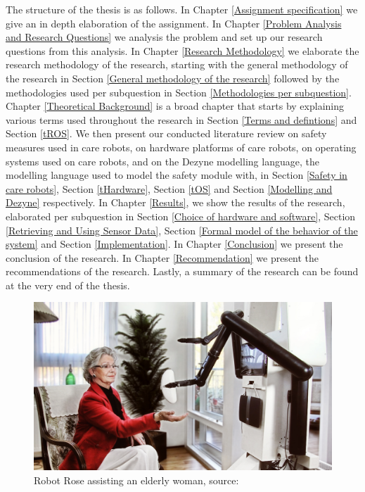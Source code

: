 \documentclass[12pt]{scrreprt}
\begin{document}
The structure of the thesis is as follows. In Chapter \ref{Assignment specification} we give an in depth elaboration of the assignment. In Chapter \ref{Problem Analysis and Research Questions} we analysis the problem and set up our research questions from this analysis. In Chapter \ref{Research Methodology} we elaborate the research methodology of the research, starting with the general methodology of the research in Section \ref{General methodology of the research} followed by the methodologies used per subquestion in Section \ref{Methodologies per subquestion}. Chapter \ref{Theoretical Background} is a broad chapter that starts by explaining various terms used throughout the research in Section \ref{Terms and defintions} and Section \ref{tROS}. We then present our conducted literature review on safety measures used in care robots, on hardware platforms of care robots, on operating systems used on care robots, and on the Dezyne modelling language, the modelling language used to model the safety module with, in Section \ref{Safety in care robots}, Section \ref{tHardware}, Section \ref{tOS} and Section \ref{Modelling and Dezyne} respectively. In Chapter \ref{Results}, we show the results of the research, elaborated per subquestion in Section \ref{Choice of hardware and software}, Section \ref{Retrieving and Using Sensor Data}, Section \ref{Formal model of the behavior of the system} and Section \ref{Implementation}. In Chapter \ref{Conclusion} we present the conclusion of the research. In Chapter \ref{Recommendation} we present the recommendations of the research. Lastly, a summary of the research can be found at the very end of the thesis.
 
\begin{figure}[H]
    \centering
    \includegraphics[width=\textwidth]{Figures/assisting_the_elderly.jpg}
    \caption{Robot Rose assisting an elderly woman, source: \cite{rose_specification}}
    \label{fig:assiting_the_elderly}
\end{figure}
\end{document}
